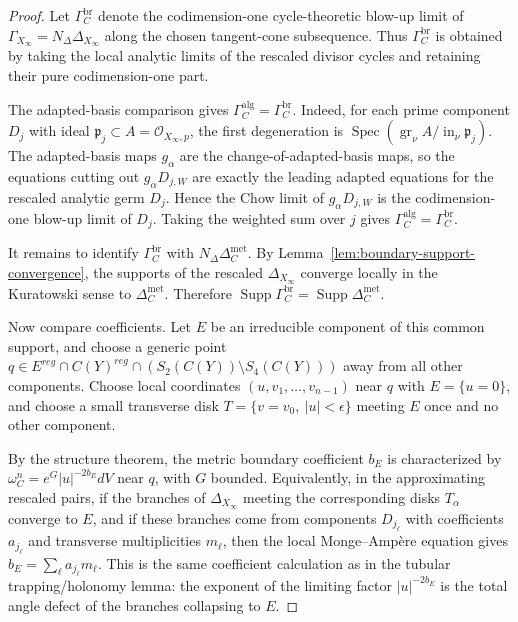 \documentclass[11pt]{amsart}
\theoremstyle{definition}
\theoremstyle{remark}
\begin{document}
\begin{proof}
Let $\Gamma_C^{\mathrm{br}}$ denote the codimension-one cycle-theoretic blow-up
limit of $\Gamma_{X_\infty}=N_\Delta\Delta_{X_\infty}$ along the chosen
tangent-cone subsequence. Thus $\Gamma_C^{\mathrm{br}}$ is obtained by taking
the local analytic limits of the rescaled divisor cycles and retaining their
pure codimension-one part.

The adapted-basis comparison gives
$\Gamma_C^{\mathrm{alg}}=\Gamma_C^{\mathrm{br}}$. Indeed, for each prime
component $D_j$ with ideal $\mathfrak p_j\subset A=\mathcal O_{X_\infty,p}$, the
first degeneration is
$\operatorname{Spec}(\operatorname{gr}_\nu A/\operatorname{in}_\nu\mathfrak p_j)$.
The adapted-basis maps $g_\alpha$ are the change-of-adapted-basis maps, so the equations
cutting out $g_\alpha D_{j,W}$ are exactly the leading adapted equations for
the rescaled analytic germ $D_j$. Hence the Chow limit of $g_\alpha D_{j,W}$ is
the codimension-one blow-up limit of $D_j$. Taking the weighted sum over $j$
gives $\Gamma_C^{\mathrm{alg}}=\Gamma_C^{\mathrm{br}}$.

It remains to identify $\Gamma_C^{\mathrm{br}}$ with
$N_\Delta\Delta_C^{\mathrm{met}}$. By
Lemma~\ref{lem:boundary-support-convergence}, the supports of the rescaled
$\Delta_{X_\infty}$ converge locally in the Kuratowski sense to
$\Delta_C^{\mathrm{met}}$. Therefore
$\operatorname{Supp}\Gamma_C^{\mathrm{br}}=\operatorname{Supp}\Delta_C^{\mathrm{met}}$.

Now compare coefficients. Let $E$ be an irreducible component of this common
support, and choose a generic point
$q\in E^{reg}\cap C(Y)^{reg}\cap(S_2(C(Y))\setminus S_4(C(Y)))$
away from all other components. Choose local coordinates
$(u,v_1,\dots,v_{n-1})$ near $q$ with $E=\{u=0\}$, and choose a small transverse
disk $T=\{v=v_0,\ |u|<\epsilon\}$ meeting $E$ once and no other component.

By the structure theorem, the metric boundary coefficient $b_E$ is characterized
by
$\omega_C^n=e^G|u|^{-2b_E}dV$ near $q$, with $G$ bounded. Equivalently, in the
approximating rescaled pairs, if the branches of
$\Delta_{X_\infty}$ meeting the corresponding disks $T_\alpha$ converge to
$E$, and if these branches come from components $D_{j_\ell}$ with coefficients
$a_{j_\ell}$ and transverse multiplicities $m_\ell$, then the local
Monge--Amp\`ere equation gives
$b_E=\sum_\ell a_{j_\ell}m_\ell$.
This is the same coefficient calculation as in the tubular trapping/holonomy
lemma: the exponent of the limiting factor $|u|^{-2b_E}$ is the total angle
defect of the branches collapsing to $E$.


\end{proof}
\end{document}
